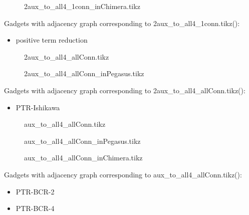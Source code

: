 \documentclass{article}
\begin{document}
\begin{figure}

\caption{2aux\_to\_all4\_1conn\_inChimera.tikz}
\end{figure}

Gadgets with adjacency graph corresponding to 2aux\_to\_all4\_1conn.tikz(\scalebox{.25}{}):

\begin{itemize}
\item positive term reduction
\end{itemize}

\begin{figure}

\caption{2aux\_to\_all4\_allConn.tikz}
\end{figure}

\begin{figure}

\caption{2aux\_to\_all4\_allConn\_inPegasus.tikz}
\end{figure}



Gadgets with adjacency graph corresponding to 2aux\_to\_all4\_allConn.tikz(\scalebox{.25}{}):

\begin{itemize}
\item PTR-Ishikawa
\end{itemize}

\begin{figure}

\caption{aux\_to\_all4\_allConn.tikz}
\end{figure}

\begin{figure}

\caption{aux\_to\_all4\_allConn\_inPegasus.tikz}
\end{figure}

\begin{figure}

\caption{aux\_to\_all4\_allConn\_inChimera.tikz}
\end{figure}

Gadgets with adjacency graph corresponding to aux\_to\_all4\_allConn.tikz(\scalebox{.25}{}):

\begin{itemize}
\item PTR-BCR-2
\item PTR-BCR-4
\end{itemize}
\end{document}
